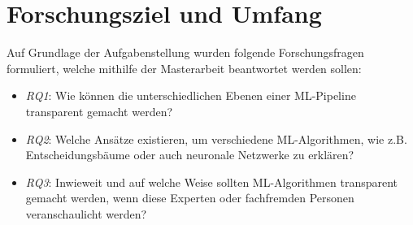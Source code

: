 \section{Forschungsziel und Umfang}
\label{sec:ForschungszielundUmfang}
Auf Grundlage der Aufgabenstellung wurden folgende Forschungsfragen formuliert, welche mithilfe der Masterarbeit beantwortet werden sollen:
\begin{itemize}
    \item \textit{RQ1}: Wie können die unterschiedlichen Ebenen einer ML-Pipeline transparent gemacht werden?
    \item \textit{RQ2}: Welche Ansätze existieren, um verschiedene ML-Algorithmen, wie z.B. Entscheidungsbäume oder auch neuronale Netzwerke zu erklären?
    \item \textit{RQ3}: Inwieweit und auf welche Weise sollten ML-Algorithmen transparent gemacht werden, wenn diese Experten oder fachfremden Personen veranschaulicht werden?
\end{itemize}